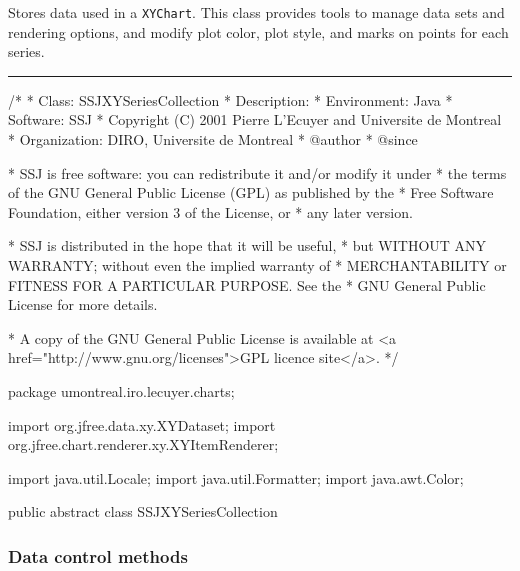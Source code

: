 
Stores data used in a \texttt{XYChart}.
This class provides tools to manage data sets and rendering options, and modify
plot color, plot style, and marks on points for each series.

\bigskip\hrule
\begin{code}
\begin{hide}
/*
 * Class:        SSJXYSeriesCollection
 * Description:  
 * Environment:  Java
 * Software:     SSJ 
 * Copyright (C) 2001  Pierre L'Ecuyer and Universite de Montreal
 * Organization: DIRO, Universite de Montreal
 * @author       
 * @since

 * SSJ is free software: you can redistribute it and/or modify it under
 * the terms of the GNU General Public License (GPL) as published by the
 * Free Software Foundation, either version 3 of the License, or
 * any later version.

 * SSJ is distributed in the hope that it will be useful,
 * but WITHOUT ANY WARRANTY; without even the implied warranty of
 * MERCHANTABILITY or FITNESS FOR A PARTICULAR PURPOSE.  See the
 * GNU General Public License for more details.

 * A copy of the GNU General Public License is available at
   <a href="http://www.gnu.org/licenses">GPL licence site</a>.
 */
\end{hide}
package umontreal.iro.lecuyer.charts;\begin{hide}

import   org.jfree.data.xy.XYDataset;
import   org.jfree.chart.renderer.xy.XYItemRenderer;

import   java.util.Locale;
import   java.util.Formatter;
import   java.awt.Color;\end{hide}

public abstract class SSJXYSeriesCollection \begin{hide} {
   protected XYItemRenderer renderer;
   protected XYDataset seriesCollection;
\end{hide}
\end{code}

\subsubsection*{Data control methods}

